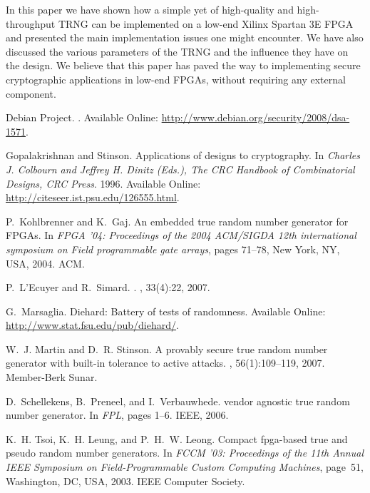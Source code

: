 \documentclass[conference]{IEEEtran}
\begin{document}
In this paper we have shown how a simple yet of high-quality and high-throughput TRNG can be implemented on a low-end Xilinx Spartan 3E FPGA and presented the main implementation issues one might encounter. We have also discussed the various parameters of the TRNG and the influence they have on the design. We believe that this paper has paved the way to implementing secure cryptographic applications in low-end FPGAs, without requiring any external component.



\begin{thebibliography}{10}

{Debian Project}.
.
\newblock Available Online: \url{http://www.debian.org/security/2008/dsa-1571}.

Gopalakrishnan and Stinson.
\newblock Applications of designs to cryptography.
\newblock In {\em Charles J. Colbourn and Jeffrey H. Dinitz (Eds.), The {CRC}
  Handbook of Combinatorial Designs, {CRC} Press}. 1996.
\newblock Available Online: \url{http://citeseer.ist.psu.edu/126555.html}.

P.~Kohlbrenner and K.~Gaj.
\newblock An embedded true random number generator for {FPGAs}.
\newblock In {\em FPGA '04: Proceedings of the 2004 ACM/SIGDA 12th
  international symposium on Field programmable gate arrays}, pages 71--78, New
  York, NY, USA, 2004. ACM.

P.~L'Ecuyer and R.~Simard.
.
, 33(4):22, 2007.

G.~Marsaglia.
\newblock Diehard: Battery of tests of randomness.
\newblock Available Online: \url{http://www.stat.fsu.edu/pub/diehard/}.

W.~J. Martin and D.~R. Stinson.
\newblock A provably secure true random number generator with built-in
  tolerance to active attacks.
, 56(1):109--119, 2007.
\newblock Member-Berk Sunar.

D.~Schellekens, B.~Preneel, and I.~Verbauwhede.
 vendor agnostic true random number generator.
\newblock In {\em FPL}, pages 1--6. IEEE, 2006.

K.~H. Tsoi, K.~H. Leung, and P.~H.~W. Leong.
\newblock Compact fpga-based true and pseudo random number generators.
\newblock In {\em FCCM '03: Proceedings of the 11th Annual IEEE Symposium on
  Field-Programmable Custom Computing Machines}, page~51, Washington, DC, USA,
  2003. IEEE Computer Society.


\end{thebibliography}
\end{document}
